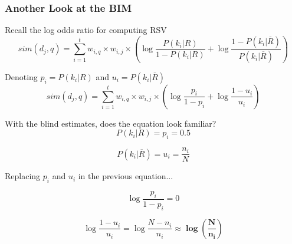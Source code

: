 \documentclass[svgnames]{beamer}
\begin{document}
\begin{frame}[allowframebreaks]
\frametitle{Another Look at the BIM}

  \begin{block}{Recall the log odds ratio for computing RSV}
    \small
    \begin{displaymath}      
      sim(d_j,q) = \sum_{i=1}^t w_{i,q} \times w_{i,j} \times
      \left(
        \log\frac{P(k_i|R)}{1-P(k_i|R)} + \log\frac{1-P(k_i|\overline{R})}{P(k_i|\overline{R})}
      \right)
    \end{displaymath}
  \end{block}
  
  \begin{block}{Denoting $p_i = P(k_i|R)$ and $u_i = P(k_i|\overline{R})$}
    \small
    \begin{displaymath}      
      sim(d_j,q) = \sum_{i=1}^t w_{i,q} \times w_{i,j} \times
      \left(
        \log\frac{p_i}{1 - p_i} + \log\frac{1 - u_i}{u_i}
      \right)
    \end{displaymath}
  \end{block}
		
  \begin{block}{With the blind estimates, does the equation look familiar?}
    \begin{displaymath}  
    P(k_i|R) = p_i = 0.5
    \end{displaymath}
    
    \begin{displaymath}  
    P(k_i|\overline{R}) = u_i = \frac{n_i}{N}
    \end{displaymath}
    
    \begin{center}
    Replacing $p_i$ and $u_i$ in the previous equation...
    \end{center}
    
     \begin{displaymath}      
       \log\frac{p_i}{1 - p_i} = 0
    \end{displaymath}
    
    \begin{displaymath}      
       \log\frac{1 - u_i}{u_i} = \log\frac{N - n_i}{n_i} \approx \mathbf{\log \left( \frac{N}{n_i} \right)}
    \end{displaymath}
  \end{block}
  

\end{frame}
\end{document}
